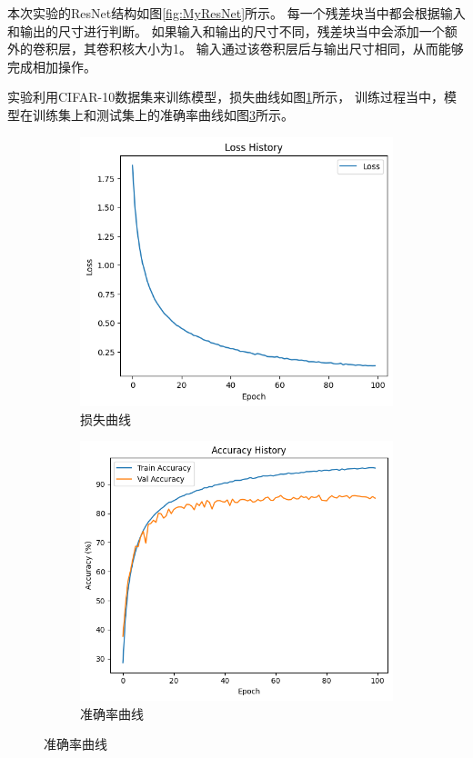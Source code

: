 本次实验的ResNet结构如图\ref{fig:MyResNet}所示。
每一个残差块当中都会根据输入和输出的尺寸进行判断。
如果输入和输出的尺寸不同，残差块当中会添加一个额外的卷积层，其卷积核大小为1。
输入通过该卷积层后与输出尺寸相同，从而能够完成相加操作。

实验利用CIFAR-10数据集来训练模型，损失曲线如图\ref{fig:resnetlosshistory}所示，
训练过程当中，模型在训练集上和测试集上的准确率曲线如图\ref{fig:resnetmetrics}所示。

\begin{figure}[H]
    \begin{subfigure}[c]{0.45\textwidth}
        \centering
        \includegraphics[width=\textwidth]{../output/resnet/loss_history.png}
        \caption{损失曲线}
        \label{fig:resnetlosshistory}
    \end{subfigure}
    \hfill
    \begin{subfigure}[c]{0.45\textwidth}
        \centering
        \includegraphics[width=\textwidth]{../output/resnet/metrics.png}
        \caption{准确率曲线}
        \label{fig:resnetmetrics}
    \end{subfigure}
\end{figure}

